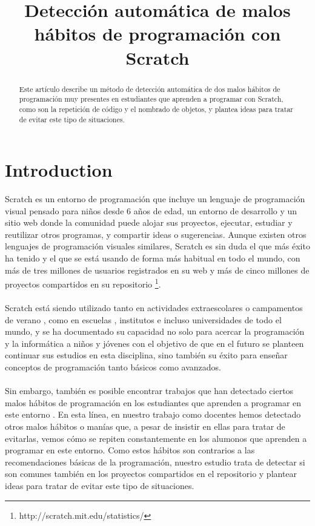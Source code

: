 \documentclass[a4paper,10pt]{article}
\title{Detección automática de malos hábitos de programación con Scratch}
\begin{document}
\maketitle

\begin{abstract}
Este artículo describe un método de detección automática de dos malos hábitos de programación muy presentes en estudiantes que aprenden a programar con Scratch, como son la repetición de código y el nombrado de objetos, y plantea ideas para tratar de
evitar este tipo de situaciones.

\end{abstract}

\section{Introduction}
Scratch \cite{resnick2009scratch} es un entorno de programación que incluye un lenguaje de programación visual pensado para niños desde 6 años de edad, un entorno de desarrollo y un sitio web donde la comunidad puede alojar sus proyectos, ejecutar, estudiar y reutilizar otros programas, y compartir ideas o sugerencias. Aunque existen otros lenguajes de programación visuales similares, Scratch es sin duda el que más éxito ha tenido y el que se está usando de forma más habitual en todo el mundo, con más de tres millones de usuarios registrados en su web y más de cinco millones de proyectos compartidos en su repositorio \footnote{http://scratch.mit.edu/statistics/}.
\paragraph{}Scratch está siendo utilizado tanto en actividades extraescolares \cite{maloney2008programming, kafai2010entering} o campamentos de verano \cite{adams2010scratching, franklin2013assessment}, como en escuelas \cite{wilson2012evaluation}, institutos \cite{meerbaum2013learning} e incluso universidades \cite{wolz2009starting, malan2007scratch} de todo el mundo, y se ha documentado su capacidad no solo para acercar la programación y la informática a niños y jóvenes con el objetivo de que en el futuro se planteen continuar sus estudios en esta disciplina, sino también su éxito para enseñar conceptos de programación tanto básicos como avanzados.
\paragraph{}Sin embargo, también es posible encontrar trabajos que han detectado ciertos malos hábitos de programación en los estudiantes que aprenden a programar en este entorno \cite{meerbaum2011habits}. En esta línea, en nuestro trabajo como docentes hemos detectado otros malos hábitos o manías que, a pesar de insistir en ellas para tratar de evitarlas, vemos cómo se repiten constantemente en los alumonos que aprenden a programar en este entorno. Como estos hábitos son contrarios a las recomendaciones básicas de la programación, nuestro estudio trata de detectar si son comunes también en los proyectos compartidos en el repositorio y plantear ideas para tratar de evitar este tipo de situaciones.
\end{document}
